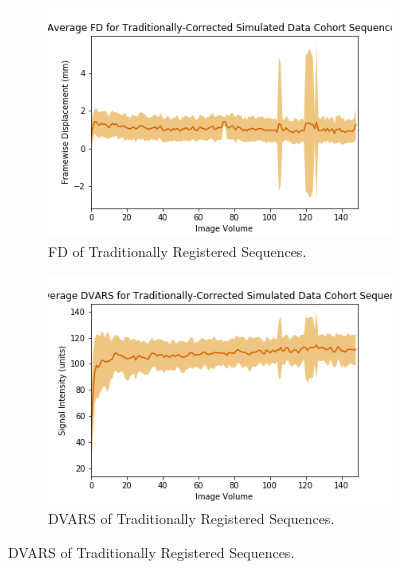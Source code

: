 \begin{figure}[t]
	\begin{subfigure}{0.4\textwidth}
		\centering
		\includegraphics[width=1.0\textwidth]{6/figures/spectr-trad-fd-150.png}
		\caption{FD of Traditionally Registered Sequences.}
	\end{subfigure}
	\hspace{0.05\textwidth}
	\begin{subfigure}{0.4\textwidth}
		\centering
		\includegraphics[width=1.0\textwidth]{6/figures/spectr-trad-dvars-150.png}
		\caption{DVARS of Traditionally Registered Sequences.}
	\end{subfigure}
	

\end{figure}
